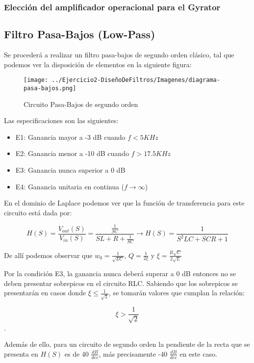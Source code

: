 \subsubsection{Elección del amplificador operacional para el Gyrator}


\subsection{Filtro Pasa-Bajos (Low-Pass)}

Se procederá a realizar un filtro pasa-bajos de segundo orden clásico, tal que podemos
ver la disposición de elementos en la siguiente figura:

\begin{figure}[H]
    \centering
    \texttt{[image: ../Ejercicio2-DiseñoDeFiltros/Imagenes/diagrama-pasa-bajos.png]}
    \caption{Circuito Pasa-Bajos de segundo orden}
\end{figure}

Las especificaciones son las siguientes:

\begin{itemize}
	\item E1: Ganancia mayor a -3 dB cuando $f < 5 KHz$ 
	\item E2: Ganancia menor a -10 dB cuando $f > 17.5 KHz $
	\item E3: Ganancia nunca superior a 0 dB
	\item E4: Ganancia unitaria en continua ($f \to \infty$)
\end{itemize}

En el dominio de Laplace podemos ver que la función de transferencia para este circuito está dada por:

$$H(S)=\frac{V_{out}(S)}{V_{in}(S)}=\frac{\frac{1}{SC}}{SL+R+\frac{1}{SC}} \longrightarrow 
H(S)=\frac{1}{S^2LC+SCR+1}$$

De allí podemos observar que $w_0=\frac{1}{\sqrt{LC}}$, $Q=\frac{1}{2\xi}$ y $\xi=\frac{R\sqrt{C}}{2\sqrt{L}}$

Por la condición E3, la ganancia nunca deberá superar a 0 dB entonces no se deben presentar sobrepicos en el circuito RLC.
Sabiendo que los sobrepicos se presentarán en casos donde $\xi \leq \frac{1}{\sqrt{2}}$, se tomarán valores que cumplan la relación:

$$\xi > \frac{1}{\sqrt{2}}$$.

Además de ello, para un circuito de segundo orden la pendiente de la recta que se presenta en $H(S)$ es de 
40 $\frac{dB}{dec}$, más precisamente -40 $\frac{dB}{dec}$ en este caso. 

